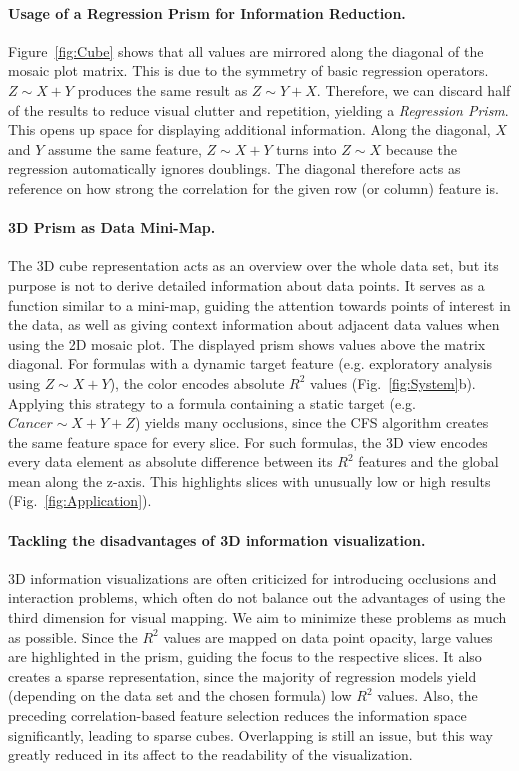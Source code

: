 \documentclass[journal]{style/vgtc} 			          %
\begin{document}
\paragraph{Usage of a Regression Prism for Information Reduction.}
Figure~\ref{fig:Cube} shows that all values are mirrored along the diagonal of the mosaic plot matrix.
This is due to the symmetry of basic regression operators.
$Z \sim X + Y$ produces the same result as $Z \sim Y + X$.
Therefore, we can discard half of the results to reduce visual clutter and repetition, yielding a \emph{Regression Prism}.
This opens up space for displaying additional information.
Along the diagonal, $X$ and $Y$ assume the same feature, $Z \sim X + Y$ turns into $Z \sim X$ because the regression automatically ignores doublings.
The diagonal therefore acts as reference on how strong the correlation for the given row (or column) feature is.

\paragraph{3D Prism as Data Mini-Map.}
The 3D cube representation acts as an overview over the whole data set, but its purpose is not to derive detailed information about data points.
It serves as a function similar to a mini-map, guiding the attention towards points of interest in the data, as well as giving context information about adjacent data values when using the 2D mosaic plot.
The displayed prism shows values above the matrix diagonal.
For formulas with a dynamic target feature (e.g. exploratory analysis using $Z \sim X + Y$), the color encodes absolute $R^2$ values (Fig.~\ref{fig:System}b).
Applying this strategy to a formula containing a static target (e.g. $Cancer \sim X + Y + Z$) yields many occlusions, since the CFS algorithm creates the same feature space for every slice.
For such formulas, the 3D view encodes every data element as absolute difference between its $R^2$ features and the global mean along the z-axis.
This highlights slices with unusually low or high results (Fig.~\ref{fig:Application}).
\paragraph{Tackling the disadvantages of 3D information visualization.}
3D information visualizations are often criticized for introducing occlusions and interaction problems, which often do not balance out the advantages of using the third dimension for visual mapping.
We aim to minimize these problems as much as possible.
Since the $R^2$ values are mapped on data point opacity, large values are highlighted in the prism, guiding the focus to the respective slices.
It also creates a sparse representation, since the majority of regression models yield (depending on the data set and the chosen formula) low $R^2$ values.
Also, the preceding correlation-based feature selection reduces the information space significantly, leading to sparse cubes.
Overlapping is still an issue, but this way greatly reduced in its affect to the readability of the visualization.
\end{document}
